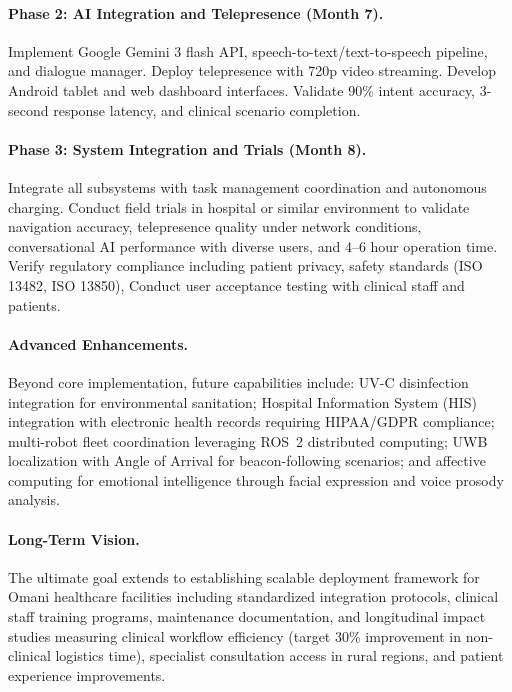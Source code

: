 \paragraph{Phase 2: AI Integration and Telepresence (Month 7).} Implement Google Gemini 3 flash API, speech-to-text/text-to-speech pipeline, and dialogue manager. Deploy telepresence with 720p video streaming. Develop Android tablet and web dashboard interfaces. Validate 90\% intent accuracy, 3-second response latency, and clinical scenario completion.

\paragraph{Phase 3: System Integration and Trials (Month 8).} Integrate all subsystems with task management coordination and autonomous charging. Conduct field trials in hospital or similar environment to validate navigation accuracy, telepresence quality under network conditions, conversational AI performance with diverse users, and 4--6 hour operation time. Verify regulatory compliance including patient privacy, safety standards (ISO 13482, ISO 13850), Conduct user acceptance testing with clinical staff and patients.

\paragraph{Advanced Enhancements.} Beyond core implementation, future capabilities include: UV-C disinfection integration for environmental sanitation; Hospital Information System (HIS) integration with electronic health records requiring HIPAA/GDPR compliance; multi-robot fleet coordination leveraging ROS~2 distributed computing; UWB localization with Angle of Arrival for beacon-following scenarios; and affective computing for emotional intelligence through facial expression and voice prosody analysis.

\paragraph{Long-Term Vision.} The ultimate goal extends to establishing scalable deployment framework for Omani healthcare facilities including standardized integration protocols, clinical staff training programs, maintenance documentation, and longitudinal impact studies measuring clinical workflow efficiency (target 30\% improvement in non-clinical logistics time), specialist consultation access in rural regions, and patient experience improvements.
